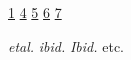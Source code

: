 \soulregister\uline1
\soulregister\uline4
\soulregister\uline5
\soulregister\uline6
\soulregister\uline7  %

\soulregister{}
\soulregister{}
\soulregister{}
\soulregister{}
\soulregister{}  %


\renewcommand{\etal}{\textit{et\hairsp{}al.}\xspace}  %
\soulregister\etal{}
\newcommand{\ibid}{\textit{ibid.}\xspace}  %
\soulregister\ibid{}
\newcommand{\Ibid}{\textit{Ibid.}\xspace}  %
\soulregister\Ibid{}
\newcommand{\etc}{etc. \xspace}  %
\soulregister\etc{}
